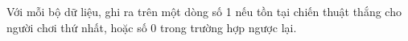 Với mỗi bộ dữ liệu, ghi ra trên một dòng số 1 nếu tồn tại chiến thuật thắng cho người chơi thứ nhất, hoặc số 0 trong trường hợp ngược lại.  

\